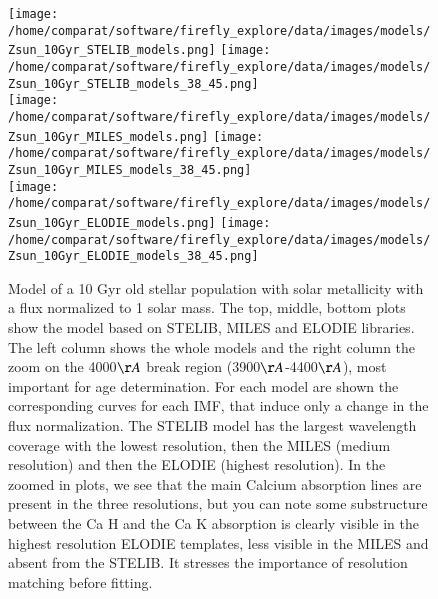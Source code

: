 \documentclass[onecolumn]{aa}
\begin{document}
\begin{figure}
\begin{center}
\caption{\label{fig:distributions:10Gyr:models} 
Model of a 10 Gyr old stellar population with solar metallicity with a flux normalized to 1 solar mass. The top, middle, bottom plots show the model based on STELIB, MILES and ELODIE libraries. 
The left column shows the whole models and the right column the zoom on the 4000$\AA$ break region (3900$\AA$-4400$\AA$), most important for age determination. 
For each model are shown the corresponding curves for each IMF, that induce only a change in the flux normalization. 
The STELIB model has the largest wavelength coverage with the lowest resolution, then the MILES (medium resolution) and then the ELODIE (highest resolution).
In the zoomed in plots, we see that the main Calcium absorption lines are present in the three resolutions, but you can note some substructure between the Ca H and the Ca K absorption is clearly visible in the highest resolution ELODIE templates, less visible in the MILES and absent from the STELIB. 
It stresses the importance of resolution matching before fitting.
}  
\texttt{[image: /home/comparat/software/firefly\_explore/data/images/models/Zsun\_10Gyr\_STELIB\_models.png]}
\texttt{[image: /home/comparat/software/firefly\_explore/data/images/models/Zsun\_10Gyr\_STELIB\_models\_38\_45.png]} \\

\texttt{[image: /home/comparat/software/firefly\_explore/data/images/models/Zsun\_10Gyr\_MILES\_models.png]}
\texttt{[image: /home/comparat/software/firefly\_explore/data/images/models/Zsun\_10Gyr\_MILES\_models\_38\_45.png]} \\

\texttt{[image: /home/comparat/software/firefly\_explore/data/images/models/Zsun\_10Gyr\_ELODIE\_models.png]}
\texttt{[image: /home/comparat/software/firefly\_explore/data/images/models/Zsun\_10Gyr\_ELODIE\_models\_38\_45.png]}
\end{center}
\end{figure}

% 
\end{document}
